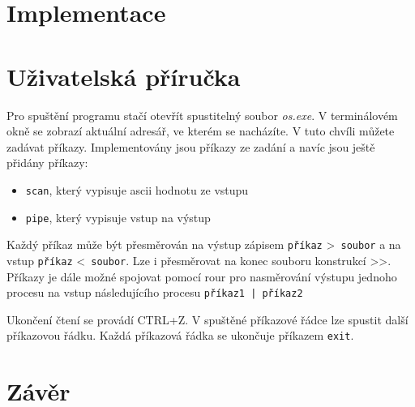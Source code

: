 \documentclass[a4paper]{article}
\begin{document}

%


\section{Implementace}

\section{Uživatelská příručka}
Pro spuštění programu stačí otevřít spustitelný soubor \emph{os.exe}. V terminálovém okně se zobrazí aktuální adresář, ve kterém se nacházíte. V tuto chvíli můžete zadávat příkazy.
 Implementovány jsou příkazy ze zadání a navíc jsou ještě přidány příkazy: 
\begin{itemize}
\item  \verb+scan+, který vypisuje ascii hodnotu ze vstupu
\item  \verb+pipe+, který vypisuje vstup na výstup
\end{itemize}

Každý příkaz může být přesměrován na výstup zápisem  \verb+příkaz+ \textgreater  \verb+ soubor+ a na vstup  \verb+příkaz+ \textless  \verb+ soubor+. Lze i přesměrovat na konec souboru konstrukcí \textgreater\textgreater. Příkazy je dále možné spojovat pomocí rour pro nasměrování výstupu jednoho procesu na vstup následujícího procesu  \verb+příkaz1 | příkaz2+

Ukončení čtení se provádí CTRL+Z. 
V spuštěné příkazové řádce lze spustit další příkazovou řádku. Každá příkazová řádka se ukončuje příkazem \verb+exit+. 



\section{Závěr}
\end{document}
